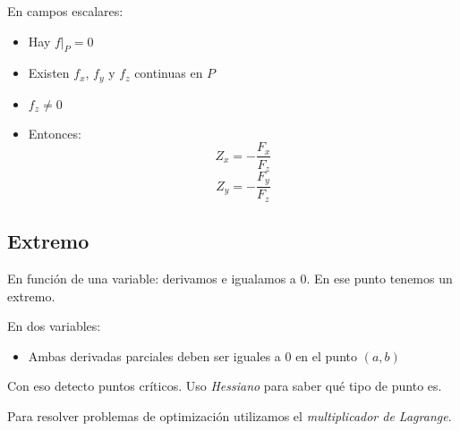En campos escalares:
\begin{itemize}
    \item Hay $f|_P = 0$
    \item Existen $f_x$, $f_y$ y $f_z$ continuas en $P$
    \item $f_z \neq 0$
    \item Entonces:
          $$Z_x = -\frac{F_x}{F_z}$$
          $$Z_y = -\frac{F_y}{F_z}$$
\end{itemize}

\subsection{Extremo}

En función de una variable: derivamos e igualamos a 0. En ese punto tenemos un 
extremo.

En dos variables:
\begin{itemize}
    \item Ambas derivadas parciales deben ser iguales a 0 en el punto $(a,b)$
\end{itemize}

Con eso detecto puntos críticos.
Uso \textit{Hessiano} para saber qué tipo de punto es.

Para resolver problemas de optimización utilizamos el
\textit{multiplicador de Lagrange}.
